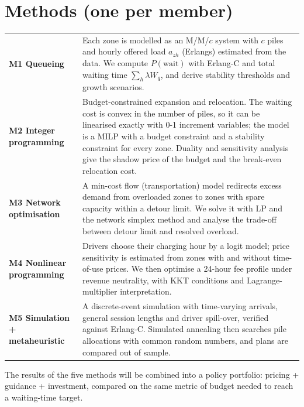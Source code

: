 \documentclass[11pt,a4paper]{article}
\begin{document}
\section{Methods (one per member)}
\begin{tabular}{@{}p{3.1cm}p{12.6cm}@{}}
\toprule
\textbf{M1 Queueing} & Each zone is modelled as an M/M/$c$ system with $c$ piles and hourly offered load $a_{zh}$ (Erlangs) estimated from the data. We compute $P(\text{wait})$ with Erlang-C and total waiting time $\sum_h \lambda W_q$, and derive stability thresholds and growth scenarios.\\
\textbf{M2 Integer programming} & Budget-constrained expansion and relocation. The waiting cost is convex in the number of piles, so it can be linearised exactly with 0-1 increment variables; the model is a MILP with a budget constraint and a stability constraint for every zone. Duality and sensitivity analysis give the shadow price of the budget and the break-even relocation cost.\\
\textbf{M3 Network optimisation} & A min-cost flow (transportation) model redirects excess demand from overloaded zones to zones with spare capacity within a detour limit. We solve it with LP and the network simplex method and analyse the trade-off between detour limit and resolved overload.\\
\textbf{M4 Nonlinear programming} & Drivers choose their charging hour by a logit model; price sensitivity is estimated from zones with and without time-of-use prices. We then optimise a 24-hour fee profile under revenue neutrality, with KKT conditions and Lagrange-multiplier interpretation.\\
\textbf{M5 Simulation + metaheuristic} & A discrete-event simulation with time-varying arrivals, general session lengths and driver spill-over, verified against Erlang-C. Simulated annealing then searches pile allocations with common random numbers, and plans are compared out of sample.\\
\bottomrule
\end{tabular}

The results of the five methods will be combined into a policy portfolio: pricing + guidance + investment, compared on the same metric of budget needed to reach a waiting-time target.
\end{document}
